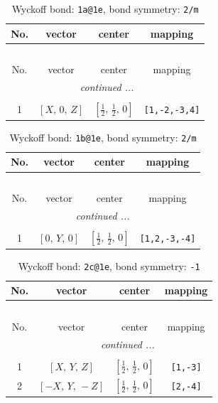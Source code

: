 \documentclass[fleqn,8pt]{jsarticle}
\begin{document}
\begin{longtable}{cccc}
\caption{Wyckoff bond: {\tt 1a@1e}, bond symmetry: {\tt 2/m}}
 \\
 \hline \hline
No. & vector & center & mapping \\ \hline \endfirsthead

\multicolumn{3}{l}{\tablename\ \thetable{}} \\
 \hline \hline
No. & vector & center & mapping \\ \hline \endhead

 \hline \hline
\multicolumn{3}{r}{\footnotesize\it continued ...} \\ \endfoot

 \hline \hline
\multicolumn{3}{r}{} \\ \endlastfoot

1 & $\left[ X,\, 0,\, Z \right]$ & $\left[ \frac{1}{2},\, \frac{1}{2},\, 0 \right]$ & {\tt [1,-2,-3,4]} \\
\end{longtable}
\renewcommand{\arraystretch}{1.2}
\begin{longtable}{cccc}
\caption{Wyckoff bond: {\tt 1b@1e}, bond symmetry: {\tt 2/m}}
 \\
 \hline \hline
No. & vector & center & mapping \\ \hline \endfirsthead

\multicolumn{3}{l}{\tablename\ \thetable{}} \\
 \hline \hline
No. & vector & center & mapping \\ \hline \endhead

 \hline \hline
\multicolumn{3}{r}{\footnotesize\it continued ...} \\ \endfoot

 \hline \hline
\multicolumn{3}{r}{} \\ \endlastfoot

1 & $\left[ 0,\, Y,\, 0 \right]$ & $\left[ \frac{1}{2},\, \frac{1}{2},\, 0 \right]$ & {\tt [1,2,-3,-4]} \\
\end{longtable}
\renewcommand{\arraystretch}{1.2}
\begin{longtable}{cccc}
\caption{Wyckoff bond: {\tt 2c@1e}, bond symmetry: {\tt -1}}
 \\
 \hline \hline
No. & vector & center & mapping \\ \hline \endfirsthead

\multicolumn{3}{l}{\tablename\ \thetable{}} \\
 \hline \hline
No. & vector & center & mapping \\ \hline \endhead

 \hline \hline
\multicolumn{3}{r}{\footnotesize\it continued ...} \\ \endfoot

 \hline \hline
\multicolumn{3}{r}{} \\ \endlastfoot

1 & $\left[ X,\, Y,\, Z \right]$ & $\left[ \frac{1}{2},\, \frac{1}{2},\, 0 \right]$ & {\tt [1,-3]} \\ \hline
2 & $\left[ - X,\, Y,\, - Z \right]$ & $\left[ \frac{1}{2},\, \frac{1}{2},\, 0 \right]$ & {\tt [2,-4]} \\
\end{longtable}
\end{document}
